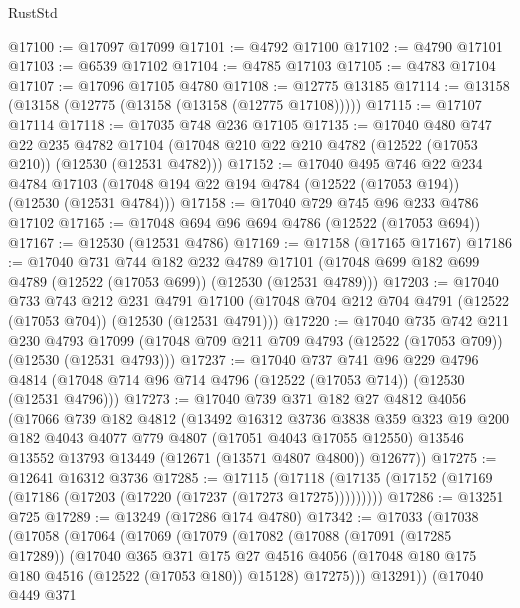 \begin{lexlean}{RustStd}
\begin{coremodule}
@17100 := @17097 @17099
@17101 := @4792 @17100
@17102 := @4790 @17101
@17103 := @6539 @17102
@17104 := @4785 @17103
@17105 := @4783 @17104
@17107 := @17096 @17105 @4780
@17108 := @12775 @13185
@17114 := @13158 (@13158 (@12775 (@13158 (@13158 (@12775 @17108)))))
@17115 := @17107 @17114
@17118 := @17035 @748 @236 @17105
@17135 := @17040
    @480
    @747
    @22
    @235
    @4782
    @17104
    (@17048 @210 @22 @210 @4782 (@12522 (@17053 @210)) (@12530 (@12531 @4782)))
@17152 := @17040
    @495
    @746
    @22
    @234
    @4784
    @17103
    (@17048 @194 @22 @194 @4784 (@12522 (@17053 @194)) (@12530 (@12531 @4784)))
@17158 := @17040 @729 @745 @96 @233 @4786 @17102
@17165 := @17048 @694 @96 @694 @4786 (@12522 (@17053 @694))
@17167 := @12530 (@12531 @4786)
@17169 := @17158 (@17165 @17167)
@17186 := @17040
    @731
    @744
    @182
    @232
    @4789
    @17101
    (@17048 @699 @182 @699 @4789 (@12522 (@17053 @699)) (@12530 (@12531 @4789)))
@17203 := @17040
    @733
    @743
    @212
    @231
    @4791
    @17100
    (@17048 @704 @212 @704 @4791 (@12522 (@17053 @704)) (@12530 (@12531 @4791)))
@17220 := @17040
    @735
    @742
    @211
    @230
    @4793
    @17099
    (@17048 @709 @211 @709 @4793 (@12522 (@17053 @709)) (@12530 (@12531 @4793)))
@17237 := @17040
    @737
    @741
    @96
    @229
    @4796
    @4814
    (@17048 @714 @96 @714 @4796 (@12522 (@17053 @714)) (@12530 (@12531 @4796)))
@17273 := @17040
    @739
    @371
    @182
    @27
    @4812
    @4056
    (@17066
      @739
      @182
      @4812
      (@13492
        @16312
        @3736
        @3838
        @359
        @323
        @19
        @200
        @182
        @4043
        @4077
        @779
        @4807
        (@17051 @4043 @17055 @12550)
        @13546
        @13552
        @13793
        @13449
        (@12671 (@13571 @4807 @4800))
        @12677))
@17275 := @12641 @16312 @3736
@17285 := @17115
    (@17118 (@17135 (@17152 (@17169 (@17186 (@17203 (@17220 (@17237 (@17273 @17275)))))))))
@17286 := @13251 @725
@17289 := @13249 (@17286 @174 @4780)
@17342 := @17033
    (@17038
      (@17058
        (@17064
          (@17069
            (@17079
              (@17082
                (@17088
                  (@17091 (@17285 @17289))
                  (@17040
                    @365
                    @371
                    @175
                    @27
                    @4516
                    @4056
                    (@17048 @180 @175 @180 @4516 (@12522 (@17053 @180)) @15128)
                    @17275)))
              @13291))
          (@17040
            @449
            @371

\end{coremodule}
\end{lexlean}
